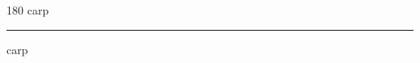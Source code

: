 
\begin{frame}
\begin{center}
\begin{turn}{180}
{\fontsize{2.5cm}{1em}\selectfont carp}
\end{turn}
\vspace{1em}\par  
\hrule
\vspace{1em}\par  
{\fontsize{2.5cm}{1em}\selectfont carp}
\end{center}
\end{frame}
